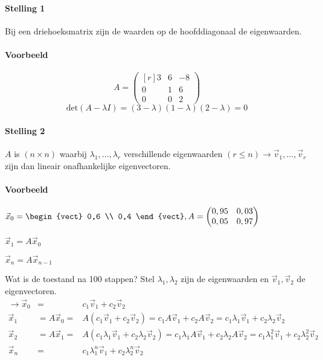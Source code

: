 \paragraph{Stelling 1}  Bij een driehoeksmatrix zijn de waarden op de hoofddiagonaal de eigenwaarden.

\paragraph{Voorbeeld}
\[ A = \begin{pmatrix*}[r]
	3 & 6 & -8 \\
	0 & 1 & 6 \\
	0 & 0 & 2
\end{pmatrix*} \]
\[ \mbox{det}(A - \lambda I) = (3 - \lambda) (1 - \lambda) (2 - \lambda) = 0 \]

\paragraph{Stelling 2}  $A$ is $(n \times n)$ waarbij $\lambda_1, \ldots, \lambda_r$ verschillende eigenwaarden $(r \leq n) \to \vec{v}_1, \ldots, \vec{v}_r$ zijn dan lineair onafhankelijke eigenvectoren.

\paragraph{Voorbeeld} $\vec{x}_0 = \begin{vect} 0,6 \\ 0,4 \end{vect}, A = \begin{pmatrix*}[r] 0,95 & 0,03 \\ 0,05 & 0,97 \end{pmatrix*}$

$ \vec{x}_1 = A \vec{x}_0 $

$ \vec{x}_n = A \vec{x}_{n-1} $

Wat is de toestand na 100 stappen? Stel $\lambda_1, \lambda_2$ zijn de eigenwaarden en $\vec{v}_1, \vec{v}_2$ de eigenvectoren.
\begin{eqnarray*}
	\to \vec{x}_0 &=& c_1 \vec{v}_1 + c_2 \vec{v}_2 \\
	\vec{x}_1 &= A \vec{x}_0 =& A(c_1 \vec{v}_1 + c_2 \vec{v}_2) = c_1 A \vec{v}_1 + c_2 A \vec{v}_2 = c_1 \lambda_1 \vec{v}_1 + c_2 \lambda_2 \vec{v}_2 \\
	\vec{x}_2 & = A \vec{x}_1 =& A(c_1 \lambda_1 \vec{v}_1 + c_2 \lambda_2 \vec{v}_2) = c_1 \lambda_1 A \vec{v}_1 + c_2 \lambda_2 A \vec{v}_2 = c_1 \lambda_1^2 \vec{v}_1 + c_2 \lambda_2^2 \vec{v}_2 \\
	\vec{x}_n &=& c_1 \lambda_1^n \vec{v}_1 + c_2 \lambda_2^n \vec{v}_2
\end{eqnarray*}

